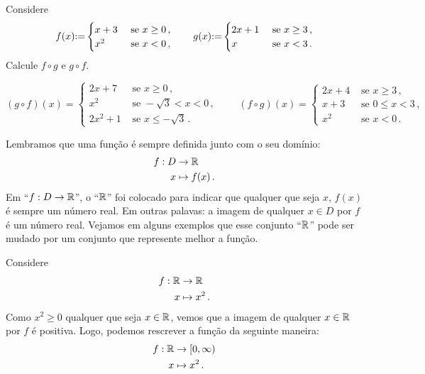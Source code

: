 \begin{exo}
Considere
$$
f(x){:=} 
\begin{cases}
 x+3&\text{ se }x\geq 0\,,\\
x^2&\text{ se }x<0\,,
\end{cases}
\quad\quad
g(x){:=} 
\begin{cases}
 2x+1&\text{ se }x\geq 3\,,\\
x&\text{ se }x<3\,.
\end{cases}
$$
Calcule $f\circ g$ e $g\circ f$.
\begin{sol}
$$
(g\circ f)(x)=
\begin{cases}
 2x+7&\text{ se }x\geq 0\,,\\
x^2&\text{ se }-\sqrt{3}<x<0\,,\\
2x^2+1&\text{ se }x\leq -\sqrt{3}\,.
\end{cases}
\quad\quad
(f\circ g)(x)=
\begin{cases}
 2x+4&\text{ se }x\geq 3\,,\\
x+3&\text{ se }0\leq x<3\,,\\
x^2&\text{ se }x<0\,.
\end{cases}
$$
\end{sol}
\end{exo}

Lembramos que uma função é sempre definida junto com o seu domínio:
\begin{align*}
f:D&\to \mathbb{R}\\
x&\mapsto f(x)\,.
\end{align*}
Em ``$f:D\to \mathbb{R}$'', o ``$\mathbb{R}$'' foi colocado para indicar que qualquer 
que seja $x$,
$f(x)$ é sempre um número real. Em outras palavas: a imagem de qualquer 
$x\in D$ por $f$ é um número real.
Vejamos em alguns exemplos que esse conjunto ``$\mathbb{R}$'' pode ser mudado 
por um conjunto que represente melhor a função.

\begin{ex}
Considere
\begin{align*}
f:\mathbb{R}&\to \mathbb{R}\\
x&\mapsto x^2\,.
\end{align*}
Como $x^2\geq  0$ qualquer que seja $x\in \mathbb{R}$, 
vemos que a imagem de qualquer $x\in \mathbb{R}$ por $f$ é positiva.
Logo, podemos rescrever a função da seguinte maneira:
\begin{align*}
f:\mathbb{R}&\to [0,\infty)\\
x&\mapsto x^2\,.
\end{align*}
\end{ex}

